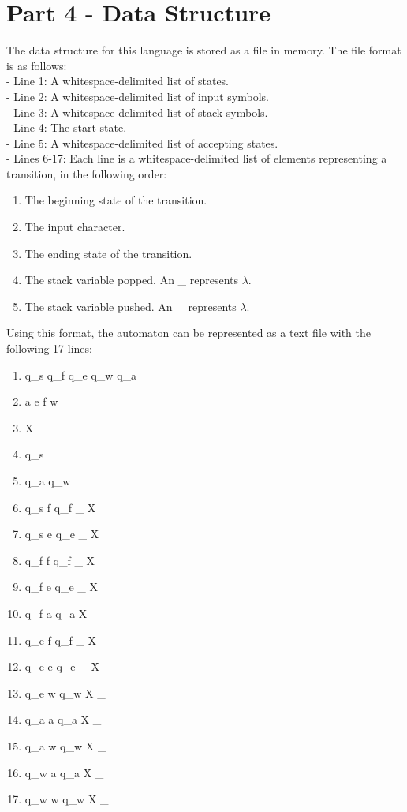 \documentclass{article}
\begin{document}
\section{Part 4 - Data Structure}
The data structure for this language is stored as a file in memory. The file format is as follows:\\
- Line 1: A whitespace-delimited list of states.\\
- Line 2: A whitespace-delimited list of input symbols. \\
- Line 3: A whitespace-delimited list of stack symbols. \\
- Line 4: The start state. \\
- Line 5: A whitespace-delimited list of accepting states. \\
- Lines 6-17: Each line is a whitespace-delimited list of elements representing a transition, in the following order:
\begin{enumerate}
    \item The beginning state of the transition.
    \item The input character.
    \item The ending state of the transition.
    \item The stack variable popped. An \_ represents $\lambda$.
    \item The stack variable pushed. An \_ represents $\lambda$. 
\end{enumerate}
Using this format, the automaton can be represented as a text file with the following 17 lines:
\begin{enumerate}
    \item q\_s q\_f q\_e q\_w q\_a
    \item a e f w
    \item X
    \item q\_s
    \item q\_a q\_w
    \item q\_s f q\_f \_ X
    \item q\_s e q\_e \_ X
    \item q\_f f q\_f \_ X
    \item q\_f e q\_e \_ X
    \item q\_f a q\_a X \_
    \item q\_e f q\_f \_ X
    \item q\_e e q\_e \_ X
    \item q\_e w q\_w X \_
    \item q\_a a q\_a X \_
    \item q\_a w q\_w X \_
    \item q\_w a q\_a X \_
    \item q\_w w q\_w X \_
\end{enumerate}
\end{document}
